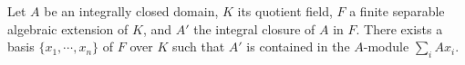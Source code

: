 Let $A$ be an integrally closed domain, $K$ its quotient field, $F$ a finite separable algebraic extension of $K$, and $A'$ the integral closure of $A$ in $F$. There exists a basis $\{x_1, \cdots, x_n\}$ of $F$ over $K$ such that $A'$ is contained in the $A$-module $\sum_i A x_i$.
